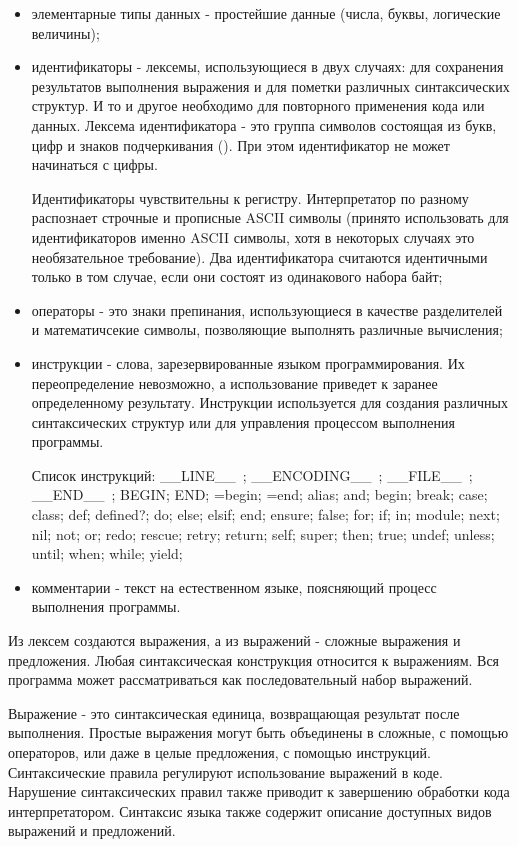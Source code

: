 \begin{itemize}
  \item элементарные типы данных - простейшие данные (числа, буквы, логические величины);

  \item идентификаторы - лексемы, использующиеся в двух случаях: для сохранения результатов выполнения выражения и для пометки различных синтаксических структур. И то и другое необходимо для повторного применения кода или данных. Лексема идентификатора - это группа символов состоящая из букв, цифр и знаков подчеркивания (\mono{_}). При этом идентификатор не может начинаться с цифры.

  Идентификаторы чувствительны к регистру. Интерпретатор по разному распознает строчные и прописные ASCII символы (принято использовать для идентификаторов именно ASCII символы, хотя в некоторых случаях это необязательное требование). Два идентификатора считаются идентичными только в том случае, если они состоят из одинакового набора байт;

  \item операторы - это знаки препинания, использующиеся в качестве разделителей и математичсекие символы, позволяющие выполнять различные вычисления;

  \item инструкции - слова, зарезервированные языком программирования. Их переопределение невозможно, а использование приведет к заранее определенному результату. Инструкции используется для создания различных синтаксических структур или для управления процессом выполнения программы.

  Список инструкций: __LINE__~; __ENCODING__~; __FILE__~; __END__~; BEGIN; END; =begin; =end; alias; and; begin; break; case; class; def; defined?; do; else; elsif; end; ensure; false; for; if; in; module; next; nil; not; or; redo; rescue; retry; return; self; super; then; true; undef; unless; until; when; while; yield;

  \item комментарии - текст на естественном языке, поясняющий процесс выполнения программы.
\end{itemize}

Из лексем создаются выражения, а из выражений - сложные выражения и предложения. Любая синтаксическая конструкция относится к выражениям. Вся программа может рассматриваться как последовательный набор выражений.

Выражение - это синтаксическая единица, возвращающая результат после выполнения. Простые выражения могут быть объединены в сложные, с помощью операторов, или даже в целые предложения, с помощью инструкций. Синтаксические правила регулируют использование выражений в коде. Нарушение синтаксических правил также приводит к завершению обработки кода интерпретатором. Синтаксис языка также содержит описание доступных видов выражений и предложений.

